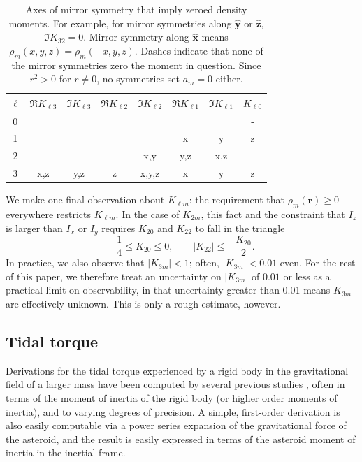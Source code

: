 \documentclass[fleqn,usenatbib]{mnras}
\newcommand{\unit}[1]{\bm{\hat{#1}}}
\begin{document}
\begin{table}
  \centering
  \begin{tabular}{c|ccccccc}
    \hline
    $\ell$ & $\Re K_{\ell 3}$ & $\Im K_{\ell 3}$ & $\Re K_{\ell 2}$ & $\Im K_{\ell 2}$ & $\Re K_{\ell 1}$ & $\Im K_{\ell 1}$ & $K_{\ell 0}$ \\ \hline
    0 &  &  &  &  &  &  & -\\ 
    1 &  &  &  &  & x & y & z\\ 
    2 &  &  & - & x,y & y,z & x,z & -\\ 
    3 & x,z & y,z & z & x,y,z & x & y & z\\ \hline
  \end{tabular}
  \caption{Axes of mirror symmetry that imply zeroed density moments. For example, for mirror symmetries along $\unit y$ or $\unit z$, $\Im K_{32}=0$. Mirror symmetry along $\unit x$ means $\rho_m(x, y, z) = \rho_m(-x, y, z)$. Dashes indicate that none of the mirror symmetries zero the moment in question. Since $r^2>0$ for $r\neq 0$, no symmetries set $a_m=0$ either.}
  \label{tab:klm-symmetries}
\end{table} 

We make one final observation about $K_{\ell m}$: the requirement that $\rho_m(\bm r) \geq 0$ everywhere restricts $K_{\ell m}$. In the case of $K_{2m}$, this fact and the constraint that $I_z$ is larger than $I_x$ or $I_y$ requires $K_{20}$ and $K_{22}$ to fall in the triangle
\begin{equation}
  -\frac{1}{4} \leq K_{20} \leq 0, \qquad |K_{22}| \leq -\frac{K_{20}}{2}.
  \label{eqn:parameter-bounds}
\end{equation}
In practice, we also observe that $|K_{3m}| < 1$; often, $|K_{3m}| < 0.01$ even. For the rest of this paper, we therefore treat an uncertainty on $|K_{3m}|$ of $0.01$ or less as a practical limit on observability, in that uncertainty greater than 0.01 means $K_{3m}$ are effectively unknown. This is only a rough estimate, however.





\subsection{Tidal torque}
\label{sec:tidal-torque}

Derivations for the tidal torque experienced by a rigid body in the gravitational field of a larger mass have been computed by several previous studies \cite{paul88,HouMar2017,BOUE2009750, ashenberg07}, often in terms of the moment of inertia of the rigid body (or higher order moments of inertia), and to varying degrees of precision. A simple, first-order derivation is also easily computable via a power series expansion of the gravitational force of the asteroid, and the result is easily expressed in terms of the asteroid moment of inertia in the inertial frame.
\end{document}
